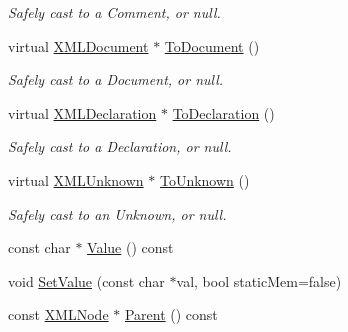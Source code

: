 \begin{DoxyCompactItemize}
\begin{DoxyCompactList}\small\item\em Safely cast to a Comment, or null. \end{DoxyCompactList}\item 
\hypertarget{classtinyxml2_1_1_x_m_l_node_ad545679e72ed7e85de208ecad69ba377}{virtual \hyperlink{classtinyxml2_1_1_x_m_l_document}{X\-M\-L\-Document} $\ast$ \hyperlink{classtinyxml2_1_1_x_m_l_node_ad545679e72ed7e85de208ecad69ba377}{To\-Document} ()}\label{classtinyxml2_1_1_x_m_l_node_ad545679e72ed7e85de208ecad69ba377}

\begin{DoxyCompactList}\small\item\em Safely cast to a Document, or null. \end{DoxyCompactList}\item 
\hypertarget{classtinyxml2_1_1_x_m_l_node_a8b5940aaa2052a2070d5fb46bc72d49c}{virtual \hyperlink{classtinyxml2_1_1_x_m_l_declaration}{X\-M\-L\-Declaration} $\ast$ \hyperlink{classtinyxml2_1_1_x_m_l_node_a8b5940aaa2052a2070d5fb46bc72d49c}{To\-Declaration} ()}\label{classtinyxml2_1_1_x_m_l_node_a8b5940aaa2052a2070d5fb46bc72d49c}

\begin{DoxyCompactList}\small\item\em Safely cast to a Declaration, or null. \end{DoxyCompactList}\item 
\hypertarget{classtinyxml2_1_1_x_m_l_node_aa9fa4034089ded1476d7994093c8d3a2}{virtual \hyperlink{classtinyxml2_1_1_x_m_l_unknown}{X\-M\-L\-Unknown} $\ast$ \hyperlink{classtinyxml2_1_1_x_m_l_node_aa9fa4034089ded1476d7994093c8d3a2}{To\-Unknown} ()}\label{classtinyxml2_1_1_x_m_l_node_aa9fa4034089ded1476d7994093c8d3a2}

\begin{DoxyCompactList}\small\item\em Safely cast to an Unknown, or null. \end{DoxyCompactList}\item 
const char $\ast$ \hyperlink{classtinyxml2_1_1_x_m_l_node_a67ec54cde5ef8dac7901ad63544c6d44}{Value} () const 
\item 
void \hyperlink{classtinyxml2_1_1_x_m_l_node_a0f625ab2d8c7b5a7cbe6227f045b6dea}{Set\-Value} (const char $\ast$val, bool static\-Mem=false)
\item 
\hypertarget{classtinyxml2_1_1_x_m_l_node_a65df1af09bb0304f0170f4f7b1bccf88}{const \hyperlink{classtinyxml2_1_1_x_m_l_node}{X\-M\-L\-Node} $\ast$ \hyperlink{classtinyxml2_1_1_x_m_l_node_a65df1af09bb0304f0170f4f7b1bccf88}{Parent} () const }\label{classtinyxml2_1_1_x_m_l_node_a65df1af09bb0304f0170f4f7b1bccf88}


\end{DoxyCompactItemize}
